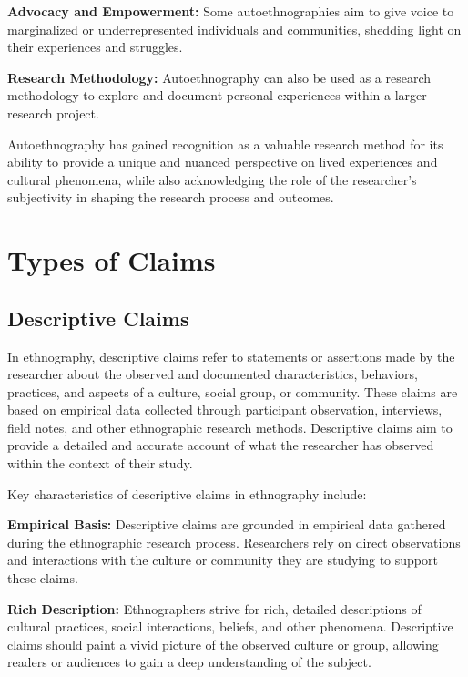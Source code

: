 \documentclass[
  b5paper]{book}
\begin{document}
\textbf{Advocacy and Empowerment:} Some autoethnographies aim to give voice to marginalized or underrepresented individuals and communities, shedding light on their experiences and struggles.

\textbf{Research Methodology:} Autoethnography can also be used as a research methodology to explore and document personal experiences within a larger research project.

Autoethnography has gained recognition as a valuable research method for its ability to provide a unique and nuanced perspective on lived experiences and cultural phenomena, while also acknowledging the role of the researcher's subjectivity in shaping the research process and outcomes.

\hypertarget{types-of-claims}{%
\section{Types of Claims}\label{types-of-claims}}

\hypertarget{descriptive-claims}{%
\subsection*{Descriptive Claims}\label{descriptive-claims}}

In ethnography, descriptive claims refer to statements or assertions made by the researcher about the observed and documented characteristics, behaviors, practices, and aspects of a culture, social group, or community. These claims are based on empirical data collected through participant observation, interviews, field notes, and other ethnographic research methods. Descriptive claims aim to provide a detailed and accurate account of what the researcher has observed within the context of their study.

Key characteristics of descriptive claims in ethnography include:

\textbf{Empirical Basis:} Descriptive claims are grounded in empirical data gathered during the ethnographic research process. Researchers rely on direct observations and interactions with the culture or community they are studying to support these claims.

\textbf{Rich Description:} Ethnographers strive for rich, detailed descriptions of cultural practices, social interactions, beliefs, and other phenomena. Descriptive claims should paint a vivid picture of the observed culture or group, allowing readers or audiences to gain a deep understanding of the subject.
\end{document}
